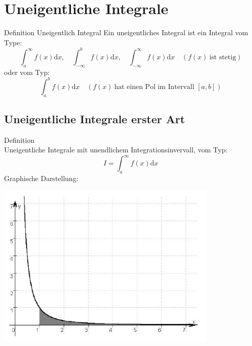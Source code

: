 \section{Uneigentliche Integrale}
\begin{definition}{Definition Uneigentlich Integral}
	Ein uneigentliches Integral ist ein Integral vom Type:
	\[\int_a^\infty{f(x)\mathrm{d}x}, \quad \int_{-\infty}^b{f(x)\mathrm{d}x}, \quad
	\int_{-\infty}^{\infty}{f(x)\mathrm{d}x} \quad (f(x) \: \text{ist stetig}) \]
	oder vom Typ:
	\[\int_a^b{f(x)\mathrm{d}x} \quad (f(x)\:\text{hat einen Pol im Intervall }[a,b]) \]
\end{definition}
\subsection{Uneigentliche Integrale erster Art}
\begin{definition}{Definition}\\
	Uneigentliche Integrale mit unendlichem Integrationsinvervall, vom Typ:
	\[I=\int_a^{\infty}{f(x)\mathrm{d}x} \]
Graphische Darstellung:
  \begin{center}
	  \includegraphics[width=0.8\textwidth]{images/Uneigentlicher_Integral_Beispiel1.png}
  \end{center}
\end{definition}
